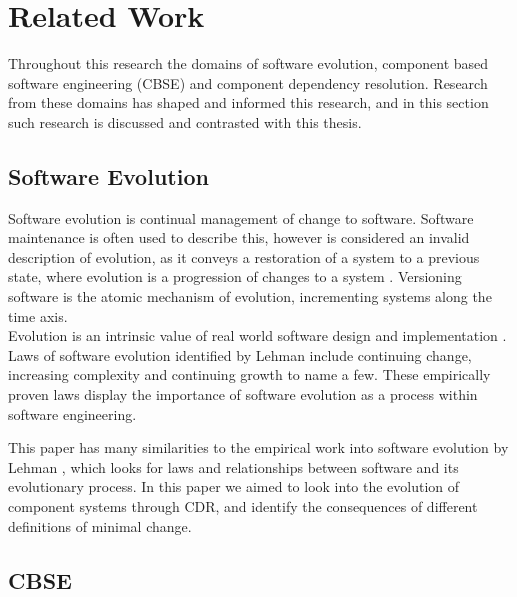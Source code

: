 



\section{Related Work}
Throughout this research the domains of software evolution, component based software engineering (CBSE) and component dependency resolution.
Research from these domains has shaped and informed this research, and in this section such research is discussed and contrasted with this thesis.

\subsection{Software Evolution}
Software evolution is continual management of change to software. 
Software maintenance is often used to describe this,
however is considered an invalid description of evolution, as it conveys a
restoration of a system to a previous state, where evolution is a progression
of changes to a system \citep{lehman_software_2006}. Versioning software is the atomic mechanism of evolution, 
incrementing systems along the time axis.\\ 
Evolution is an intrinsic value of real world software
design and implementation \citep{lehman_programs_1980}. Laws of software
evolution identified by Lehman include continuing change, increasing complexity and
continuing growth \citep{lehman_rules_2001} to name a few. These empirically proven laws
display the importance of software evolution as a process within software
engineering.

This paper has many similarities to the empirical work into software evolution by Lehman \citep{lehman1980},
which looks for laws and relationships between software and its evolutionary process.
In this paper we aimed to look into the evolution of component systems through CDR,
and identify the consequences of different definitions of minimal change. 


\subsection{CBSE}

